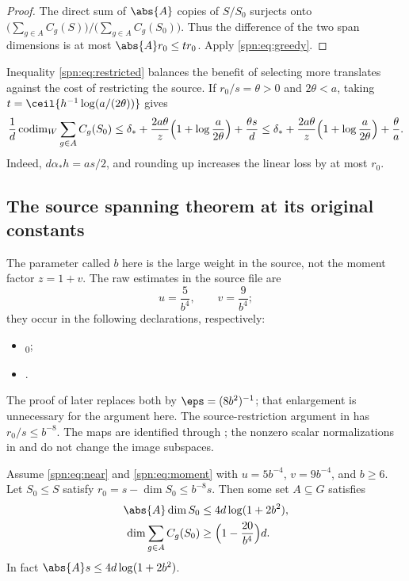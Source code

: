 \begin{proof}
The direct sum of $\abs{A}$ copies of $S/S_0$ surjects onto
$\bigl(\sum_{g\in A}C_g(S)\bigr)/\bigl(\sum_{g\in A}C_g(S_0)\bigr)$. Thus the
difference of the two span dimensions is at most $\abs{A}r_0\le tr_0$. Apply
\eqref{spn:eq:greedy}.
\end{proof}

Inequality \eqref{spn:eq:restricted} balances the benefit of selecting more
translates against the cost of restricting the source. If $r_0/s=\theta>0$ and
$2\theta<a$, taking $t=\ceil{h^{-1}\log(a/(2\theta))}$ gives
\begin{equation}\label{spn:eq:optimized}
 \frac1d\operatorname{codim}_W\sum_{g\in A}C_g(S_0)
 \le\delta_*+\frac{2a\theta}{z}\Bigl(1+\log\frac{a}{2\theta}\Bigr)
 +\frac{\theta s}{d}
 \le\delta_*+\frac{2a\theta}{z}\Bigl(1+\log\frac{a}{2\theta}\Bigr)
 +\frac{\theta}{a}.
\end{equation}
Indeed, $d\alpha_*h=as/2$, and rounding up increases the linear loss by at most
$r_0$.

\subsection{The source spanning theorem at its original constants}\label{spn:sec:source-improvement}

The parameter called $b$ here is the large weight in the source, not the moment
factor $z=1+v$. The raw estimates in the source file
 are
\[
 u=\frac5{b^4},\qquad v=\frac9{b^4};
\]
they occur in the following declarations, respectively:
\begin{itemize}
\item {}\textsubscript{0};
\item {}.
\end{itemize}
The proof of  later replaces both by
$\eps=(8b^2)^{-1}$; that enlargement is unnecessary for the argument here.
The source-restriction argument in  has
$r_0/s\le b^{-8}$. The maps are identified through ;
the nonzero scalar normalizations in  and
 do not change the image subspaces.

\begin{theorem}\label{spn:thm:source}
Assume \eqref{spn:eq:near} and \eqref{spn:eq:moment} with $u=5b^{-4}$,
$v=9b^{-4}$, and $b\ge6$. Let $S_0\le S$ satisfy
$r_0=s-\dim S_0\le b^{-8}s$. Then some set $A\subseteq G$ satisfies
\begin{align}
 \abs{A}\dim S_0&\le4d\log(1+2b^2),\label{spn:eq:sourcecount}\\
 \dim\sum_{g\in A}C_g(S_0)&\ge\Bigl(1-\frac{20}{b^4}\Bigr)d.\label{spn:eq:sourcerank}
\end{align}
In fact $\abs{A}s\le4d\log(1+2b^2)$.
\end{theorem}

